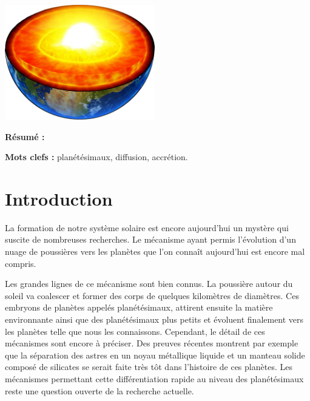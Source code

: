 \documentclass[10pt,a4paper]{article}
\numberwithin{equation}{section}
\begin{document}
\begin{titlepage}
\hrulefill


\begin{center}
\includegraphics[height=5cm]{figures/terre_core.pdf} 
\end{center} 


\textbf{Résumé :} 
\vspace{0.3cm}

\textbf{Mots clefs :} planétésimaux, diffusion, accrétion.
\vspace{0.3cm}


\tableofcontents

\end{titlepage}

\newpage
\renewcommand\thepage{\arabic{page}}


\setcounter{page}{1}




\section*{Introduction}

La formation de notre système solaire est encore aujourd'hui un mystère qui suscite de nombreuses recherches. Le mécanisme ayant permis l'évolution d'un nuage de poussières vers les planètes que l'on connaît aujourd'hui est encore mal compris. 
\medskip

Les grandes lignes de ce mécanisme sont bien connus. La poussière autour du soleil va coalescer et former des corps de quelques kilomètres de diamètres. Ces embryons de planètes appelés planétésimaux, attirent ensuite la matière environnante ainsi que des planétésimaux plus petits et évoluent finalement vers les planètes telle que nous les connaissons.
Cependant, le détail de ces mécanismes sont encore à préciser. Des preuves récentes montrent par exemple que la séparation des astres en un noyau métallique liquide et un manteau solide composé de silicates se serait faite très tôt dans l'histoire de ces planètes. Les mécanismes permettant cette différentiation rapide au niveau des planétésimaux reste une question ouverte de la recherche actuelle. 
\medskip
\end{document}
